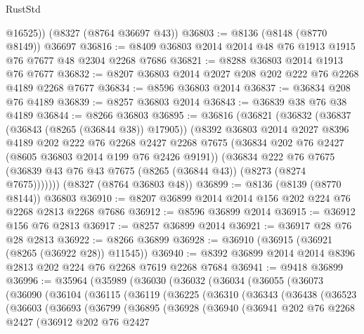 \begin{lexlean}{RustStd}
\begin{coremodule}
        @16525))
    (@8327 (@8764 @36697 @43))
@36803 := @8136 (@8148 (@8770 @8149)) @36697
@36816 := @8409 @36803 @2014 @2014 @48 @76 @1913 @1915 @76 @7677 @48 @2304 @2268 @7686
@36821 := @8288 @36803 @2014 @1913 @76 @7677
@36832 := @8207 @36803 @2014 @2027 @208 @202 @222 @76 @2268 @4189 @2268 @7677
@36834 := @8596 @36803 @2014
@36837 := @36834 @208 @76 @4189
@36839 := @8257 @36803 @2014
@36843 := @36839 @38 @76 @38 @4189
@36844 := @8266 @36803
@36895 := @36816
    (@36821
      (@36832
        (@36837 (@36843 (@8265 (@36844 @38)) @17905))
        (@8392
          @36803
          @2014
          @2027
          @8396
          @4189
          @202
          @222
          @76
          @2268
          @2427
          @2268
          @7675
          (@36834 @202 @76 @2427 (@8605 @36803 @2014 @199 @76 @2426 @9191))
          (@36834
            @222
            @76
            @7675
            (@36839 @43 @76 @43 @7675 (@8265 (@36844 @43)) (@8273 (@8274 @7675)))))))
    (@8327 (@8764 @36803 @48))
@36899 := @8136 (@8139 (@8770 @8144)) @36803
@36910 := @8207 @36899 @2014 @2014 @156 @202 @224 @76 @2268 @2813 @2268 @7686
@36912 := @8596 @36899 @2014
@36915 := @36912 @156 @76 @2813
@36917 := @8257 @36899 @2014
@36921 := @36917 @28 @76 @28 @2813
@36922 := @8266 @36899
@36928 := @36910 (@36915 (@36921 (@8265 (@36922 @28)) @11545))
@36940 := @8392 @36899 @2014 @2014 @8396 @2813 @202 @224 @76 @2268 @7619 @2268 @7684
@36941 := @9418 @36899
@36996 := @35964
    (@35989
      (@36030
        (@36032
          (@36034
            (@36055
              (@36073
                (@36090
                  (@36104
                    (@36115
                      (@36119
                        (@36225
                          (@36310
                            (@36343
                              (@36438
                                (@36523
                                  (@36603
                                    (@36693
                                      (@36799
                                        (@36895
                                          (@36928
                                            (@36940
                                              (@36941
                                                @202
                                                @76
                                                @2268
                                                @2427
                                                (@36912
                                                  @202
                                                  @76
                                                  @2427

\end{coremodule}
\end{lexlean}
